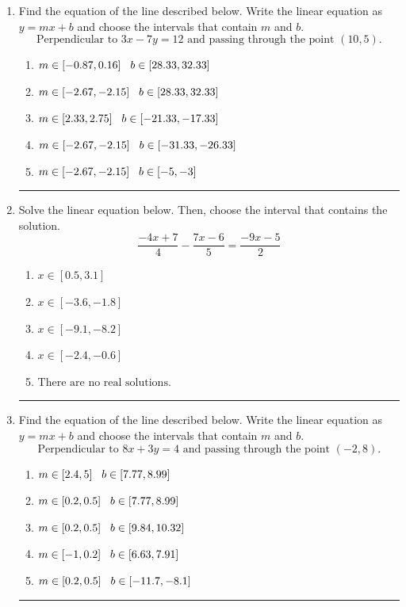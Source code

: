\documentclass[14pt]{extbook}
\newcommand{\litem}[1]{\item#1\hspace*{-1cm}\rule{\textwidth}{0.4pt}}
\begin{document}
\begin{enumerate}
{\begin{enumerate}[label=\Alph*.]
\end{enumerate} }
\litem{
Find the equation of the line described below. Write the linear equation as $ y=mx+b $ and choose the intervals that contain $m$ and $b$.\[ \text{Perpendicular to } 3 x - 7 y = 12 \text{ and passing through the point } (10, 5). \]\begin{enumerate}[label=\Alph*.]
\item \( m \in [-0.87, 0.16] \hspace*{3mm} b \in [28.33, 32.33] \)
\item \( m \in [-2.67, -2.15] \hspace*{3mm} b \in [28.33, 32.33] \)
\item \( m \in [2.33, 2.75] \hspace*{3mm} b \in [-21.33, -17.33] \)
\item \( m \in [-2.67, -2.15] \hspace*{3mm} b \in [-31.33, -26.33] \)
\item \( m \in [-2.67, -2.15] \hspace*{3mm} b \in [-5, -3] \)

\end{enumerate} }
\litem{
Solve the linear equation below. Then, choose the interval that contains the solution.\[ \frac{-4x + 7}{4} - \frac{7x -6}{5} = \frac{-9x -5}{2} \]\begin{enumerate}[label=\Alph*.]
\item \( x \in [0.5, 3.1] \)
\item \( x \in [-3.6, -1.8] \)
\item \( x \in [-9.1, -8.2] \)
\item \( x \in [-2.4, -0.6] \)
\item \( \text{There are no real solutions.} \)

\end{enumerate} }
\litem{
Find the equation of the line described below. Write the linear equation as $ y=mx+b $ and choose the intervals that contain $m$ and $b$.\[ \text{Perpendicular to } 8 x + 3 y = 4 \text{ and passing through the point } (-2, 8). \]\begin{enumerate}[label=\Alph*.]
\item \( m \in [2.4, 5] \hspace*{3mm} b \in [7.77, 8.99] \)
\item \( m \in [0.2, 0.5] \hspace*{3mm} b \in [7.77, 8.99] \)
\item \( m \in [0.2, 0.5] \hspace*{3mm} b \in [9.84, 10.32] \)
\item \( m \in [-1, 0.2] \hspace*{3mm} b \in [6.63, 7.91] \)
\item \( m \in [0.2, 0.5] \hspace*{3mm} b \in [-11.7, -8.1] \)

\end{enumerate} }
\end{enumerate}
\end{document}
